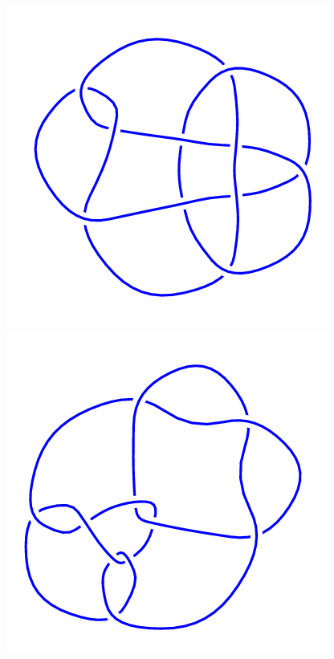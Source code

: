 \begin{figure}[H]
    \begin{minipage}[b]{.18\linewidth}
        \centering
        \includegraphics[width=\linewidth]{../data/10_147.png}
    \end{minipage}
    \begin{minipage}[b]{.18\linewidth}
        \centering
        \includegraphics[width=\linewidth]{../data/10_148.png}

\end{minipage}
\end{figure}
